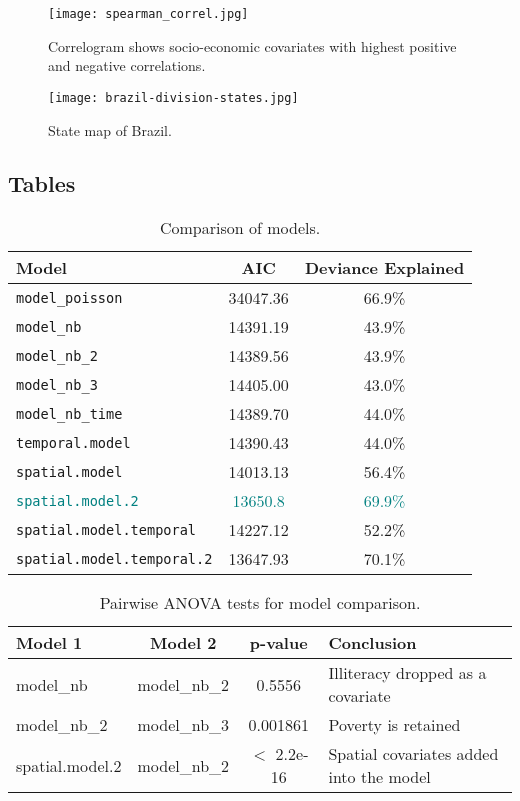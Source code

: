 
\begin{figure}[H]
\centering
\texttt{[image: spearman\_correl.jpg]}
\caption{\label{fig:spearman_correl}Correlogram shows socio-economic covariates with highest positive and negative correlations.}
\end{figure}

\begin{figure}[H]
\centering
\texttt{[image: brazil-division-states.jpg]}
\caption{\label{fig:brazil-division-states}State map of Brazil.}
\end{figure}


\subsection{Tables}

\begin{table}[H]
\centering
\begin{tabular}{l|c|c}
Model & AIC & Deviance Explained\\\hline
\texttt{model\_poisson} & 34047.36 & 66.9\%\\
\texttt{model\_nb} & 14391.19 & 43.9\%\\
\texttt{model\_nb\_2} & 14389.56 & 43.9\%\\
\texttt{model\_nb\_3} & 14405.00 & 43.0\%\\
\texttt{model\_nb\_time} & 14389.70 & 44.0\%\\
\texttt{temporal.model} & 14390.43 & 44.0\%\\
\texttt{spatial.model} & 14013.13 & 56.4\%\\
\textcolor{teal}{\texttt{spatial.model.2}} & \textcolor{teal}{13650.8} & \textcolor{teal}{69.9\%}\\
\texttt{spatial.model.temporal} & 14227.12 & 52.2\%\\
\texttt{spatial.model.temporal.2} & 13647.93 & 70.1\%
\end{tabular}
\caption{\label{tab:metrics}Comparison of models.}
\end{table}


\begin{table}[H]
\centering
\begin{tabular}{l|c|c|l}
Model 1 & Model 2 & p-value & Conclusion \\\hline
model\_nb & model\_nb\_2 & 0.5556 & Illiteracy dropped as a covariate\\
model\_nb\_2 & model\_nb\_3 & 0.001861 & Poverty is retained\\
spatial.model.2 & model\_nb\_2 & $<$ 2.2e-16 & Spatial covariates added into the model
\end{tabular}
\caption{\label{tab:ANOVA}Pairwise ANOVA tests for model comparison.}
\end{table}

